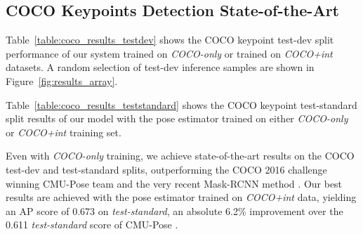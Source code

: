 \documentclass[10pt,twocolumn,letterpaper]{article}
\begin{document}
\begin{table*}[h]
\centering
\caption{Ablation on the pose estimation module: Performance on COCO keypoint \emph{test-dev} when using alternative pose estimation modules trained on \emph{COCO+int}. We use the default ResNet-101 box detection module trained on \emph{COCO-only}. We mark with an asterisk our default pose estimation module used in all other experiments.}
\label{table:poser_ablation}
\end{table*}

\subsection{COCO Keypoints Detection State-of-the-Art}
\label{sec:coco_state_of_the_art}

Table~\ref{table:coco_results_testdev} shows the COCO keypoint test-dev split performance of our system trained on \emph{COCO-only} or trained on \emph{COCO+int} datasets. A random selection of test-dev inference samples are shown in Figure~\ref{fig:results_array}.

Table~\ref{table:coco_results_teststandard} shows the COCO keypoint test-standard split results of our model with the pose estimator trained on either \emph{COCO-only} or \emph{COCO+int} training set.

Even with \emph{COCO-only} training, we achieve state-of-the-art results on the COCO test-dev and test-standard splits, outperforming the COCO 2016 challenge winning CMU-Pose team \cite{cmu_mscoco} and the very recent Mask-RCNN method \cite{he2017mask}. Our best results are achieved with the pose estimator trained on \emph{COCO+int} data, yielding an AP score of 0.673 on \emph{test-standard}, an absolute 6.2\% improvement over the 0.611 \emph{test-standard} score of CMU-Pose \cite{cmu_mscoco}.
\end{document}
